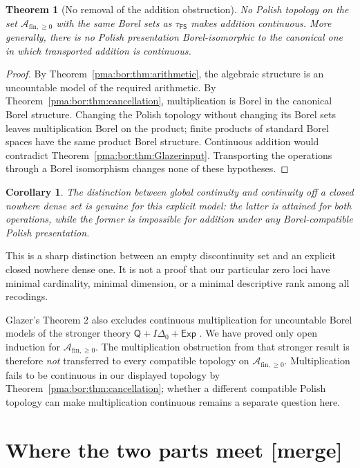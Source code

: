 \documentclass[11pt]{article}
\numberwithin{equation}{section}
\newtheorem{theorem}{Theorem}[section]
\newtheorem{corollary}[corollary]{Corollary}
\theoremstyle{definition}
\theoremstyle{remark}
\newcommand{\FS}{\mathsf{FS}}
\newcommand{\PP}{\mathcal A_{\mathrm{fin},\geq 0}}
\newcommand{\mergetag}{\textup{\textsf{\small[merge]}}}
\begin{document}
\begin{theorem}[No removal of the addition obstruction]
\label{pma:bor:thm:glazer}
No Polish topology on the set $\PP$ with the same Borel sets as
$\tau_{\FS}$ makes addition continuous. More generally, there is no Polish
presentation Borel-isomorphic to the canonical one in which transported
addition is continuous.
\end{theorem}
\begin{proof}
By Theorem~\ref{pma:bor:thm:arithmetic}, the algebraic structure is an uncountable
model of the required arithmetic. By Theorem~\ref{pma:bor:thm:cancellation},
multiplication is Borel in the canonical Borel structure. Changing the Polish
topology without changing its Borel sets leaves multiplication Borel on the
product; finite products of standard Borel spaces have the same product
Borel structure. Continuous addition would contradict
Theorem~\ref{pma:bor:thm:Glazerinput}. Transporting the operations through a Borel
isomorphism changes none of these hypotheses.
\end{proof}

\begin{corollary}
The distinction between global continuity and continuity off a closed nowhere
dense set is genuine for this explicit model: the latter is attained for both
operations, while the former is impossible for addition under any
Borel-compatible Polish presentation.
\end{corollary}

This is a sharp distinction between an empty discontinuity set and an explicit
closed nowhere dense one. It is not a proof that our particular zero loci have
minimal cardinality, minimal dimension, or a minimal descriptive rank among
all recodings.

Glazer's Theorem 2 also excludes continuous multiplication for uncountable
Borel models of the stronger theory
$\mathsf Q+I\Delta_0+\mathsf{Exp}$ \cite{Glazer}. We have proved only open
induction for $\PP$. The multiplication obstruction from that stronger
result is therefore \emph{not} transferred to every compatible topology on
$\PP$. Multiplication fails to be continuous in our displayed topology by
Theorem~\ref{pma:bor:thm:cancellation}; whether a different compatible Polish topology
can make multiplication continuous remains a separate question here.

\section{Where the two parts meet \mergetag}\label{pma:sec:boundary}
\end{document}
